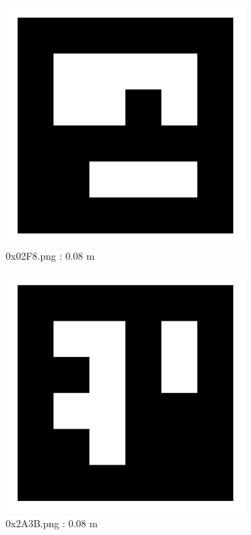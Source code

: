 \documentclass[11pt,a4,BCOR=0cm]{scrartcl}
\begin{document}
\begin{figure}
  \centering
    \includegraphics[width=8.955cm]{0x02F8.pdf}
    \caption{0x02F8.png : 0.08 m}
    \label{fig:0x02F8.pdf}
  
\end{figure} 

\begin{figure}
  \centering
    \includegraphics[width=8.955cm]{0x2A3B.pdf}
    \caption{0x2A3B.png : 0.08 m}
    \label{fig:0x2A3B.pdf}
  
\end{figure} 

\clearpage
\end{document}
